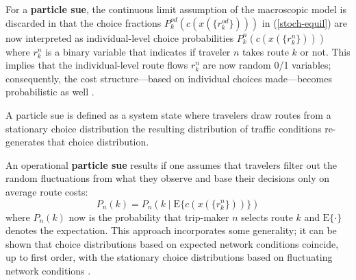 
For a \textbf{particle \gls{sue}}, the continuous limit assumption of the
macroscopic model is discarded in that the choice fractions 
$P^{od}_k(c(x(\{r^{od}_k\})))$ in (\ref{stoch-equil})
are now interpreted as individual-level choice probabilities
%
$P^{n}_k(c(x(\{r_k^{n}\})))$ where $r_k^{n}$ is a binary variable
that indicates if traveler $n$ takes route $k$ or not.
%
This implies that the individual-level route flows $r^{n}_k$ 
are now random 0/1 variables; consequently,
the cost structure---based on individual choices made---becomes probabilistic as well
\citep[][]{balijepalli-2007, cascetta-1991, cascetta-1989}.

A particle \gls{sue} is defined as a system state where travelers draw routes from a
stationary choice distribution the resulting distribution
of traffic conditions re-generates that choice distribution.

An operational \textbf{particle  \gls{sue}}
 results if one assumes that travelers filter out the
random fluctuations from what they observe and base their decisions only on average route
costs:
\begin{equation}
\label{eq:sue-with-expectation}
P_n(k) = P_n\left( k \mid \text{E} \{ c( x( \{r^{n}_k\}) ) \} \right)
\end{equation}
where $P_n(k)$ now is the probability that trip-maker $n$
selects route $k$ and $\text{E}\{\cdot\}$ denotes the expectation.
%
This approach incorporates some generality; it can be shown that 
choice distributions based on expected network conditions coincide, up
to first order, with the stationary choice distributions based on
fluctuating network conditions \citep[][]{floetteroed-2010e}.

